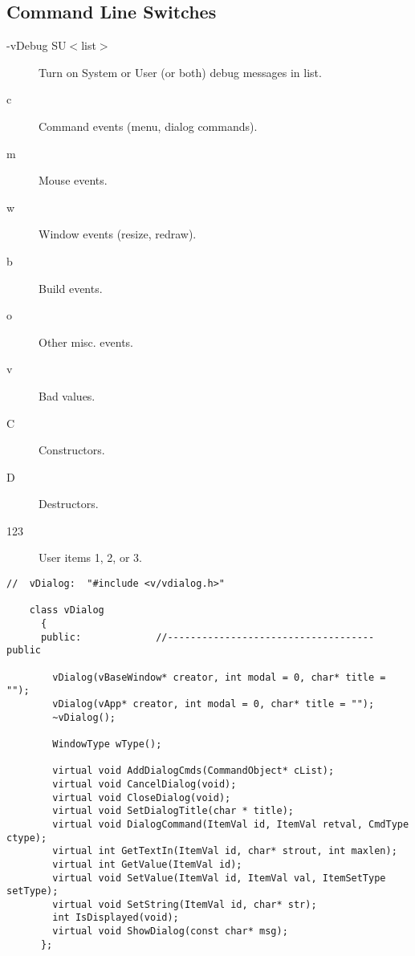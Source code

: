 \subsection* {Command Line Switches}
\begin{description}
\item [-vDebug SU$<$list$>$] Turn on System or User (or both) 
debug messages in list.
\item [c] Command events (menu, dialog commands).
\item [m] Mouse events.
\item [w] Window events (resize, redraw).
\item [b] Build events.
\item [o] Other misc. events.
\item [v] Bad values.
\item [C] Constructors.
\item [D] Destructors.
\item [123] User items 1, 2, or 3.
\end{description}


\footnotesize
\begin{verbatim}
//  vDialog:  "#include <v/vdialog.h>"

    class vDialog
      {
      public:             //------------------------------------ public

        vDialog(vBaseWindow* creator, int modal = 0, char* title = "");
        vDialog(vApp* creator, int modal = 0, char* title = "");
        ~vDialog();

        WindowType wType();

        virtual void AddDialogCmds(CommandObject* cList);
        virtual void CancelDialog(void);
        virtual void CloseDialog(void);
        virtual void SetDialogTitle(char * title);
        virtual void DialogCommand(ItemVal id, ItemVal retval, CmdType ctype);
        virtual int GetTextIn(ItemVal id, char* strout, int maxlen);
        virtual int GetValue(ItemVal id);
        virtual void SetValue(ItemVal id, ItemVal val, ItemSetType setType);
        virtual void SetString(ItemVal id, char* str);
        int IsDisplayed(void);
        virtual void ShowDialog(const char* msg);
      };
\end{verbatim}
\normalfont\normalsize



